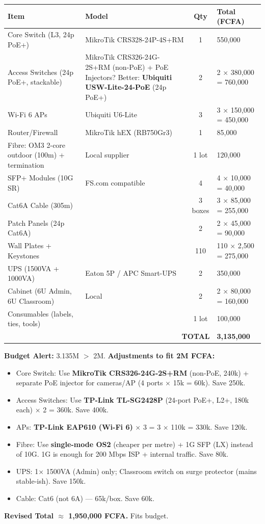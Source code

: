 \documentclass[11pt]{article}
\begin{document}
\begin{exoresolu}
\begin{center}
\begin{tabularx}{\linewidth}{|l|X|c|l|}\hline
\rowcolor{popblueL}
\textbf{Item} & \textbf{Model} & \textbf{Qty} & \textbf{Total (FCFA)} \\ \hline
Core Switch (L3, 24p PoE+) & MikroTik CRS328-24P-4S+RM & 1 & 550,000 \\ \hline
Access Switches (24p PoE+, stackable) & MikroTik CRS326-24G-2S+RM (non-PoE) + PoE Injectors? Better: \textbf{Ubiquiti USW-Lite-24-PoE} (24p PoE+) & 2 & 2 × 380,000 = 760,000 \\ \hline
Wi-Fi 6 APs & Ubiquiti U6-Lite & 3 & 3 × 150,000 = 450,000 \\ \hline
Router/Firewall & MikroTik hEX (RB750Gr3) & 1 & 85,000 \\ \hline
Fibre: OM3 2-core outdoor (100m) + termination & Local supplier & 1 lot & 120,000 \\ \hline
SFP+ Modules (10G SR) & FS.com compatible & 4 & 4 × 10,000 = 40,000 \\ \hline
Cat6A Cable (305m) & & 3 boxes & 3 × 85,000 = 255,000 \\ \hline
Patch Panels (24p Cat6A) & & 2 & 2 × 45,000 = 90,000 \\ \hline
Wall Plates + Keystones & & 110 & 110 × 2,500 = 275,000 \\ \hline
UPS (1500VA + 1000VA) & Eaton 5P / APC Smart-UPS & 2 & 350,000 \\ \hline
Cabinet (6U Admin, 6U Classroom) & Local & 2 & 2 × 80,000 = 160,000 \\ \hline
Consumables (labels, ties, tools) & & 1 lot & 100,000 \\ \hline
\multicolumn{3}{|r|}{\textbf{TOTAL}} & \textbf{3,135,000} \\ \hline
\end{tabularx}
\end{center}

\textbf{Budget Alert:} 3.135M $>$ 2M. \textbf{Adjustments to fit 2M FCFA:}
\begin{itemize}
\item Core Switch: Use \textbf{MikroTik CRS326-24G-2S+RM} (non-PoE, 240k) + separate PoE injector for cameras/AP (4 ports × 15k = 60k). Save 250k.
\item Access Switches: Use \textbf{TP-Link TL-SG2428P} (24-port PoE+, L2+, 180k each) × 2 = 360k. Save 400k.
\item APs: \textbf{TP-Link EAP610 (Wi-Fi 6)} × 3 = 3 × 110k = 330k. Save 120k.
\item Fibre: Use \textbf{single-mode OS2} (cheaper per metre) + 1G SFP (LX) instead of 10G. 1G is enough for 200 Mbps ISP + internal traffic. Save 80k.
\item UPS: 1× 1500VA (Admin) only; Classroom switch on surge protector (mains stable-ish). Save 150k.
\item Cable: Cat6 (not 6A) — 65k/box. Save 60k.
\end{itemize}
\textbf{Revised Total $\approx$ 1,950,000 FCFA.} Fits budget.


\end{exoresolu}
\end{document}
